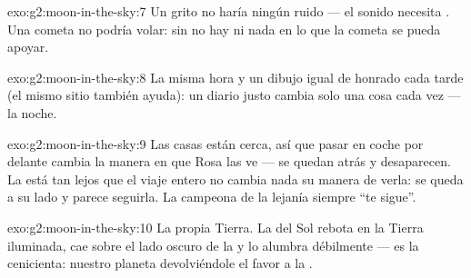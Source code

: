 \begin{solution}{exo:g2:moon-in-the-sky:7}
Un grito no haría ningún ruido --- el sonido necesita . Una
cometa no podría volar: sin  no hay  ni nada en lo que la
cometa se pueda apoyar.
\end{solution}

\begin{solution}{exo:g2:moon-in-the-sky:8}
La misma hora y un dibujo igual de honrado cada tarde (el mismo sitio
también ayuda): un diario justo cambia solo una cosa cada vez --- la
noche.
\end{solution}

\begin{solution}{exo:g2:moon-in-the-sky:9}
Las casas están cerca, así que pasar en coche por delante cambia la
manera en que Rosa las ve --- se quedan atrás y desaparecen. La
 está tan lejos que el viaje entero no cambia nada su manera de
verla: se queda a su lado y parece seguirla. La campeona de la
lejanía siempre ``te sigue''.
\end{solution}

\begin{solution}{exo:g2:moon-in-the-sky:10}
La propia Tierra. La  del Sol rebota en la Tierra iluminada, cae
sobre el lado oscuro de la  y lo alumbra débilmente --- es la
 cenicienta: nuestro planeta devolviéndole el favor a la .
\end{solution}

